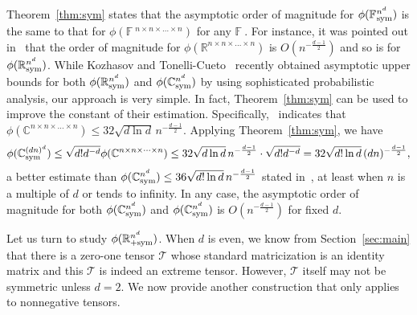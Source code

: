 \documentclass[11pt]{article}
\newcommand{\C}{\mathbb{C}}
\newcommand{\R}{\mathbb{R}}
\newcommand{\BF}{\mathbb{F}\:\!}
\newcommand{\TT}{\mathcal{T}}
\newcommand{\F}{\mathcal{F}}
\newcommand{\A}{\mathcal{A}}
\newcommand{\sym}{\textnormal{sym}}
\begin{document}

Theorem~\ref{thm:sym} states that the asymptotic order of magnitude for $\phi(\BF^{n^d}_\sym)$ is the same to that for $\phi(\BF^{n\times n\times \dots\times n})$ for any $\BF$. For instance, it was pointed out in~\cite{CKP99} that the order of magnitude for $\phi(\R^{n\times n\times\dots \times n})$ is $O(n^{-\frac{d-1}{2}})$ and so is for $\phi(\R^{n^d}_\sym)$. While Kozhasov and Tonelli-Cueto~\cite{KT22} recently obtained asymptotic upper bounds for both $\phi(\R^{n^d}_\sym)$ and $\phi(\C^{n^d}_\sym)$ by using sophisticated probabilistic analysis, our approach is very simple. In fact, Theorem~\ref{thm:sym} can be used to improve the constant of their estimation. Specifically,~\cite[Theorem 1.1]{KT22} indicates that $\phi(\C^{n\times n\times \dots\times n})\le32\sqrt{d\ln d}\,n^{-\frac{d-1}{2}}$. Applying Theorem~\ref{thm:sym}, we have
\begin{equation}\label{eq:improve}
 \phi(\C^{(dn)^d}_\sym) \le \sqrt{d!d^{-d}}\phi(\C^{n\times n\times \dots \times n}) \le 32\sqrt{d\ln d}\,n^{-\frac{d-1}{2}}\cdot \sqrt{d!d^{-d}} = 32\sqrt{d!\ln d}\,(dn)^{-\frac{d-1}{2}},
\end{equation}
a better estimate than $\phi(\C^{n^d}_\sym)\le 36\sqrt{d!\ln d}\,n^{-\frac{d-1}{2}}$ stated in~\cite[Theorem 1.2]{KT22}, at least when $n$ is a multiple of $d$ or tends to infinity. In any case, the asymptotic order of magnitude for both $\phi(\C^{n^d}_\sym)$ and $\phi(\C^{n^d}_\sym)$ is $O(n^{-\frac{d-1}{2}})$ for fixed $d$.

Let us turn to study $\phi(\R^{n^d}_{+\sym})$. When $d$ is even, we know from Section~\ref{sec:main} that there is a zero-one tensor $\TT$ whose standard matricization is an identity matrix and this $\TT$ is indeed an extreme tensor. However, $\TT$ itself may not be symmetric unless $d=2$. We now provide another construction that only applies to nonnegative tensors.
\end{document}
